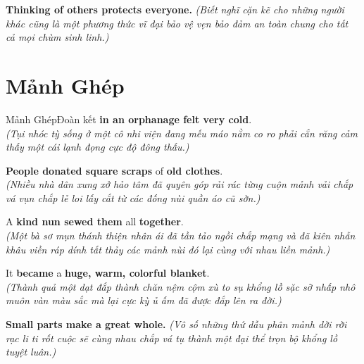 \begin{baihoc}
  \textbf{Thinking of others protects everyone.} \textit{(Biết nghĩ cặn kẽ cho những người khác cũng là một phương thức vĩ đại bảo vệ vẹn bảo đảm an toàn chung cho tất cả mọi chùm sinh linh.)}
\end{baihoc}

\vspace{0.8cm}

\ngayDay{}
\section{Mảnh Ghép}
\begin{truyen}{Mảnh Ghép}{Đoàn kết}
 \textbf{in an orphanage felt very cold}.\\
\textit{(Tụi nhóc tỳ sống ở một cô nhi viện đang mếu máo nằm co ro phải cắn răng cảm thấy một cái lạnh đọng cực độ đông thấu.)}

\textbf{People donated square scraps} of \textbf{old clothes}.\\
\textit{(Nhiều nhà dân xung xở hảo tâm đã quyên góp rải rác từng cuộn mảnh vải chắp vá vụn chắp lẻ loi lấy cắt từ các đống nùi quần áo cũ sờn.)}

A \textbf{kind nun sewed them} all \textbf{together}.\\
\textit{(Một bà sơ mụn thánh thiện nhân ái đã tần tảo ngồi chắp mạng và đã kiên nhẫn khâu viền ráp dính tất thảy các mảnh nùi đó lại cùng với nhau liền mảnh.)}

It \textbf{became} a \textbf{huge, warm, colorful blanket}.\\
\textit{(Thành quả một dạt đắp thành chăn nệm cộm xù to sụ khổng lồ sặc sỡ nhấp nhô muôn vàn màu sắc mà lại cực kỳ ủ ấm đã được đắp lên ra đời.)}
\end{truyen}

\begin{baihoc}
  \textbf{Small parts make a great whole.} \textit{(Vô số những thứ dẫu phân mảnh dời rời rạc li ti rốt cuộc sẽ cùng nhau chắp vá tụ thành một đại thể trọn bộ khổng lồ tuyệt luân.)}
\end{baihoc}

\vspace{0.8cm}

\ngayDay{}
